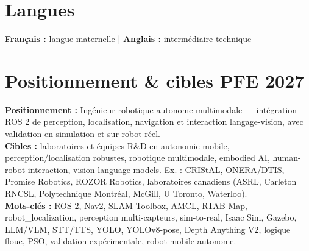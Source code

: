 \documentclass[11pt,a4paper]{article}
\begin{document}
\section{Langues}
\textbf{Français :} langue maternelle \quad | \quad \textbf{Anglais :} intermédiaire technique

\section{Positionnement \& cibles PFE 2027}
\textbf{Positionnement :} Ingénieur robotique autonome multimodale — intégration ROS 2 de perception, localisation, navigation et interaction langage-vision, avec validation en simulation et sur robot réel.\\[0.3em]
\textbf{Cibles :} laboratoires et équipes R\&D en autonomie mobile, perception/localisation robustes, robotique multimodale, embodied AI, human-robot interaction, vision-language models. Ex. : CRIStAL, ONERA/DTIS, Promise Robotics, ROZOR Robotics, laboratoires canadiens (ASRL, Carleton RNCSL, Polytechnique Montréal, McGill, U Toronto, Waterloo).\\[0.3em]
\textbf{Mots-clés :} ROS 2, Nav2, SLAM Toolbox, AMCL, RTAB-Map, robot\_localization, perception multi-capteurs, sim-to-real, Isaac Sim, Gazebo, LLM/VLM, STT/TTS, YOLO, YOLOv8-pose, Depth Anything V2, logique floue, PSO, validation expérimentale, robot mobile autonome.
\end{document}

